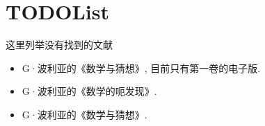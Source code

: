\chapter{TODOList}

这里列举没有找到的文献

\begin{itemize}
	\item G·波利亚的《数学与猜想》, 目前只有第一卷的电子版.
	\item G·波利亚的《数学的呃发现》.
	\item G·波利亚的《数学与猜想》.
\end{itemize}